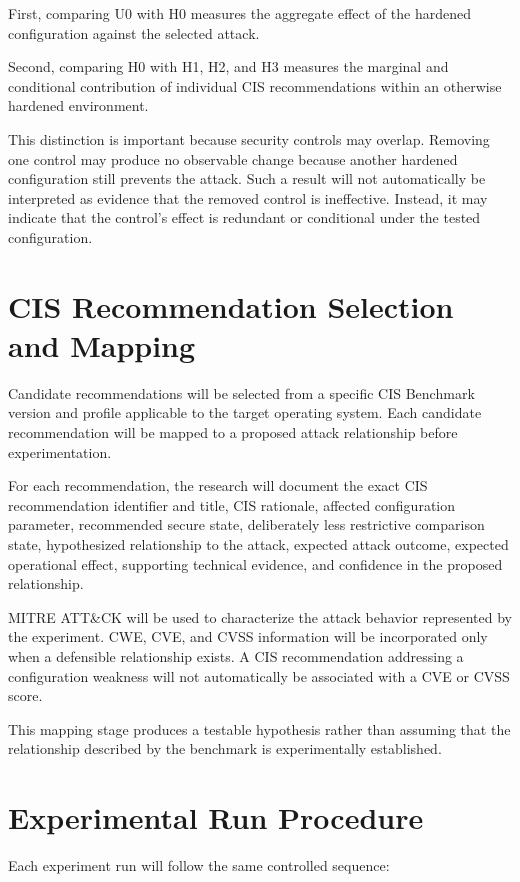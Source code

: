 \documentclass[11pt]{article}
\begin{document}
First, comparing U0 with H0 measures the aggregate effect of the
hardened configuration against the selected attack.

Second, comparing H0 with H1, H2, and H3 measures the marginal and
conditional contribution of individual CIS recommendations within an
otherwise hardened environment.

This distinction is important because security controls may overlap.
Removing one control may produce no observable change because another
hardened configuration still prevents the attack. Such a result will not
automatically be interpreted as evidence that the removed control is
ineffective. Instead, it may indicate that the control's effect is
redundant or conditional under the tested configuration.
\section{CIS Recommendation Selection and Mapping}
\label{sec:org4ca9d52}
Candidate recommendations will be selected from a specific CIS Benchmark
version and profile applicable to the target operating system. Each
candidate recommendation will be mapped to a proposed attack
relationship before experimentation.

For each recommendation, the research will document the exact CIS
recommendation identifier and title, CIS rationale, affected
configuration parameter, recommended secure state, deliberately less
restrictive comparison state, hypothesized relationship to the attack,
expected attack outcome, expected operational effect, supporting
technical evidence, and confidence in the proposed relationship.

MITRE ATT\&CK will be used to characterize the attack behavior
represented by the experiment. CWE, CVE, and CVSS information will be
incorporated only when a defensible relationship exists. A CIS
recommendation addressing a configuration weakness will not
automatically be associated with a CVE or CVSS score.

This mapping stage produces a testable hypothesis rather than assuming
that the relationship described by the benchmark is experimentally
established.
\section{Experimental Run Procedure}
\label{sec:org71985f1}

Each experiment run will follow the same controlled sequence:
\end{document}
